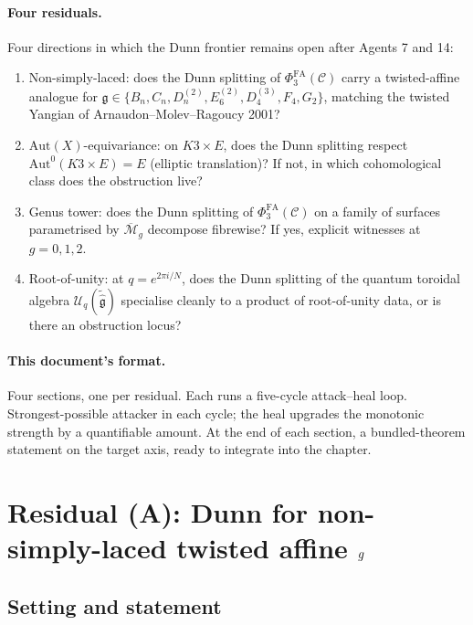 \documentclass[11pt]{article}
\newcommand{\PhiFA}{\Phi^{\mathrm{FA}}}
\newcommand{\cC}{\mathcal{C}}
\newcommand{\cM}{\mathcal{M}}
\newcommand{\cU}{\mathcal{U}}
\newcommand{\Aut}{\mathrm{Aut}}
\newcommand{\frakg}{\mathfrak{g}}
\begin{document}
\paragraph{Four residuals.}
Four directions in which the Dunn frontier remains open after Agents 7
and 14:
\begin{enumerate}[label=(\Alph*), leftmargin=*]
\item Non-simply-laced: does the Dunn splitting of $\PhiFA_3(\cC)$
  carry a twisted-affine analogue for
  $\frakg \in \{B_n, C_n, D_n^{(2)}, E_6^{(2)}, D_4^{(3)}, F_4, G_2\}$,
  matching the twisted Yangian of Arnaudon--Molev--Ragoucy 2001?
\item $\Aut(X)$-equivariance: on $K3 \times E$, does the Dunn splitting
  respect $\Aut^0(K3 \times E) = E$ (elliptic translation)? If not, in
  which cohomological class does the obstruction live?
\item Genus tower: does the Dunn splitting of $\PhiFA_3(\cC)$ on a
  family of surfaces parametrised by $\overline{\cM}_g$ decompose
  fibrewise? If yes, explicit witnesses at $g = 0, 1, 2$.
\item Root-of-unity: at $q = e^{2\pi i/N}$, does the Dunn splitting of
  the quantum toroidal algebra $\cU_q(\widetilde{\widehat{\frakg}})$
  specialise cleanly to a product of root-of-unity data, or is there
  an obstruction locus?
\end{enumerate}

\paragraph{This document's format.}
Four sections, one per residual. Each runs a five-cycle attack--heal
loop. Strongest-possible attacker in each cycle; the heal upgrades the
monotonic strength by a quantifiable amount. At the end of each
section, a bundled-theorem statement on the target axis, ready to
integrate into the chapter.

\section{Residual (A): Dunn for non-simply-laced twisted affine
  \texorpdfstring{$\widehat\frakg$}{g-hat}}
\label{sec:residual-A-non-simply-laced}

\subsection{Setting and statement}
\end{document}
